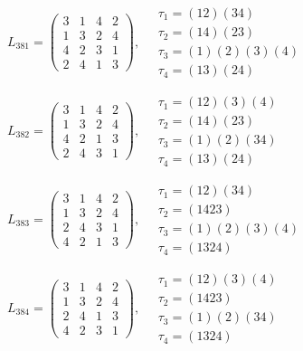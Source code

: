 $L_{381} = \begin{pmatrix} 3 & 1 & 4 & 2 \\ 1 & 3 & 2 & 4 \\ 4 & 2 & 3 & 1 \\ 2 & 4 & 1 & 3 \end{pmatrix}, \quad \begin{matrix} \tau_{1} = (1 2)(3 4) \\ \tau_{2} = (1 4)(2 3) \\ \tau_{3} = (1)(2)(3)(4) \\ \tau_{4} = (1 3)(2 4) \end{matrix}$

$L_{382} = \begin{pmatrix} 3 & 1 & 4 & 2 \\ 1 & 3 & 2 & 4 \\ 4 & 2 & 1 & 3 \\ 2 & 4 & 3 & 1 \end{pmatrix}, \quad \begin{matrix} \tau_{1} = (1 2)(3)(4) \\ \tau_{2} = (1 4)(2 3) \\ \tau_{3} = (1)(2)(3 4) \\ \tau_{4} = (1 3)(2 4) \end{matrix}$

$L_{383} = \begin{pmatrix} 3 & 1 & 4 & 2 \\ 1 & 3 & 2 & 4 \\ 2 & 4 & 3 & 1 \\ 4 & 2 & 1 & 3 \end{pmatrix}, \quad \begin{matrix} \tau_{1} = (1 2)(3 4) \\ \tau_{2} = (1 4 2 3) \\ \tau_{3} = (1)(2)(3)(4) \\ \tau_{4} = (1 3 2 4) \end{matrix}$

$L_{384} = \begin{pmatrix} 3 & 1 & 4 & 2 \\ 1 & 3 & 2 & 4 \\ 2 & 4 & 1 & 3 \\ 4 & 2 & 3 & 1 \end{pmatrix}, \quad \begin{matrix} \tau_{1} = (1 2)(3)(4) \\ \tau_{2} = (1 4 2 3) \\ \tau_{3} = (1)(2)(3 4) \\ \tau_{4} = (1 3 2 4) \end{matrix}$

